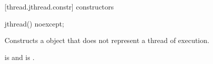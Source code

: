 \begin{codeblock}
}
\end{codeblock}



[thread.jthread.constr]{ constructors}

%
\begin{itemdecl}
jthread() noexcept;
\end{itemdecl}
\begin{itemdescr}
  \pnum\effects Constructs a  object that does not represent a thread of execution.

  \pnum\postconditions {}
        {\color{diffcolor} is  and  is }.
\end{itemdescr}


